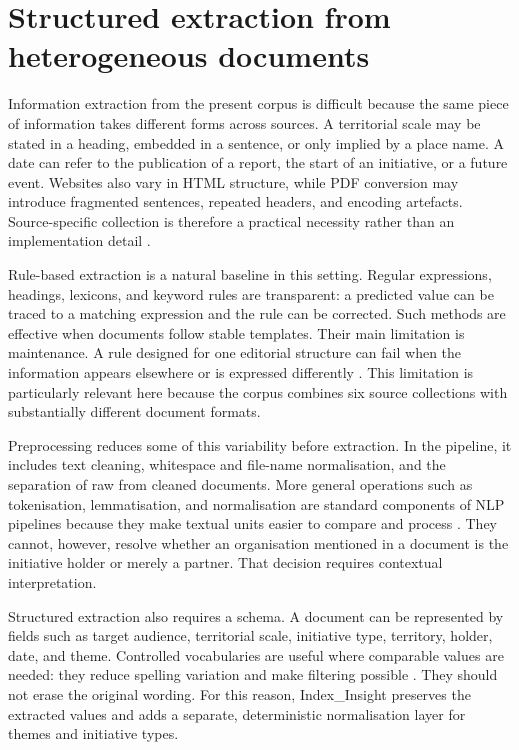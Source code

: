\section{Structured extraction from heterogeneous documents}

Information extraction from the present corpus is difficult because the same
piece of information takes different forms across sources. A territorial scale
may be stated in a heading, embedded in a sentence, or only implied by a place
name. A date can refer to the publication of a report, the start of an
initiative, or a future event. Websites also vary in HTML structure, while PDF
conversion may introduce fragmented sentences, repeated headers, and encoding
artefacts. Source-specific collection is therefore a practical necessity rather
than an implementation detail \citep{mitchell2018web}.

Rule-based extraction is a natural baseline in this setting. Regular
expressions, headings, lexicons, and keyword rules are transparent: a predicted
value can be traced to a matching expression and the rule can be corrected.
Such methods are effective when documents follow stable templates. Their main
limitation is maintenance. A rule designed for one editorial structure can fail
when the information appears elsewhere or is expressed differently
\citep{sarawagi2008information,grishman2019information}. This limitation is
particularly relevant here because the corpus combines six source collections
with substantially different document formats.

Preprocessing reduces some of this variability before extraction. In the
pipeline, it includes text cleaning, whitespace and file-name normalisation,
and the separation of raw from cleaned documents. More general operations such
as tokenisation, lemmatisation, and normalisation are standard components of
NLP pipelines because they make textual units easier to compare and process
\citep{manning1999foundations}. They cannot, however, resolve whether an
organisation mentioned in a document is the initiative holder or merely a
partner. That decision requires contextual interpretation.

Structured extraction also requires a schema. A document can be represented by
fields such as target audience, territorial scale, initiative type, territory,
holder, date, and theme. Controlled vocabularies are useful where comparable
values are needed: they reduce spelling variation and make filtering possible
\citep{hedden2016taxonomy}. They should not erase the original wording. For
this reason, Index\_Insight preserves the extracted values and adds a separate,
deterministic normalisation layer for themes and initiative types.

